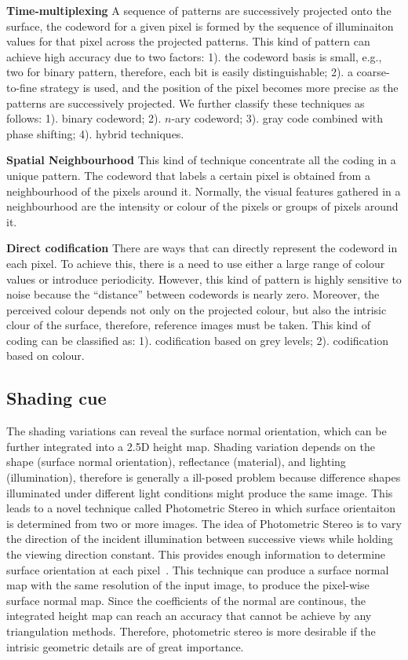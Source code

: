 \textbf{Time-multiplexing} A sequence of patterns are successively projected onto the surface, the codeword for a given pixel is formed by the sequence of illuminaiton values for that pixel across the projected patterns. This kind of pattern can achieve high accuracy due to two factors: 1). the codeword basis is small, e.g., two for binary pattern, therefore, each bit is easily distinguishable; 2). a coarse-to-fine strategy is used, and the position of the pixel becomes more precise as the patterns are successively projected. We further classify these techniques as follows: 1). binary codeword; 2). $n$-ary codeword; 3). gray code combined with phase shifting; 4). hybrid techniques.

\textbf{Spatial Neighbourhood} This kind of technique concentrate all the coding in a unique pattern. The codeword that labels a certain pixel is obtained from a neighbourhood of the pixels around it. Normally, the visual features gathered in a neighbourhood are the intensity or colour of the pixels or groups of pixels around it.

\textbf{Direct codification} There are ways that can directly represent the codeword in each pixel. To achieve this, there is a need to use either a large range of colour values or introduce periodicity. However, this kind of pattern is highly sensitive to noise because the ``distance'' between codewords is nearly zero. Moreover, the perceived colour depends not only on the projected colour, but also the intrisic clour of the surface, therefore, reference images must be taken. This kind of coding can be classified as: 1). codification based on grey levels; 2). codification based on colour.

\subsection{Shading cue}
The shading variations can reveal the surface normal orientation, which can be further integrated into a 2.5D height map. Shading variation depends on the shape (surface normal orientation), reflectance (material), and lighting (illumination), therefore is generally a ill-posed problem because difference shapes illuminated under different light conditions might produce the same image. This leads to a novel technique called Photometric Stereo in which surface orientaiton is determined from two or more images. The idea of Photometric Stereo is to vary the direction of the incident illumination between successive views while holding the viewing direction constant. This provides enough information to determine surface orientation at each pixel~\cite{woodham1979photometric}. This technique can produce a surface normal map with the same resolution of the input image, \ie to produce the pixel-wise surface normal map. Since the coefficients of the normal are continous, the integrated height map can reach an accuracy that cannot be achieve by any triangulation methods. Therefore, photometric stereo is more desirable if the intrisic geometric details are of great importance.

